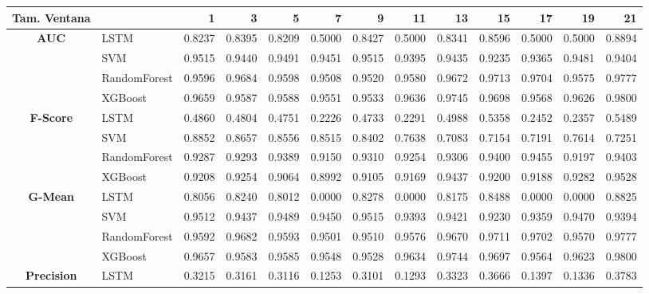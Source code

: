 \begin{table}[h]
	\centering
	\begin{adjustbox}{max width=15cm}
		\begin{tabular}{|c|l|r|r|r|r|r|r|r|r|r|r|r|}
			\hline
			\textbf{Tam. Ventana}&         &      1  &      3  &      5  &      7  &      9  &      11 &      13 &      15 &      17 &      19 &      21 \\
			\hline
			\textbf{AUC} & LSTM &  0.8237 &  0.8395 &  0.8209 &  0.5000 &  0.8427 &  0.5000 &  0.8341 &  0.8596 &  0.5000 &  0.5000 &  0.8894 \\
			& SVM &  0.9515 &  0.9440 &  0.9491 &  0.9451 &  0.9515 &  0.9395 &  0.9435 &  0.9235 &  0.9365 &  0.9481 &  0.9404 \\
			& RandomForest &  0.9596 &  0.9684 &  0.9598 &  0.9508 &  0.9520 &  0.9580 &  0.9672 &  0.9713 &  0.9704 &  0.9575 &  0.9777 \\
			& XGBoost &  0.9659 &  0.9587 &  0.9588 &  0.9551 &  0.9533 &  0.9636 &  0.9745 &  0.9698 &  0.9568 &  0.9626 &  0.9800 \\
			\hline
			\textbf{F-Score} & LSTM &  0.4860 &  0.4804 &  0.4751 &  0.2226 &  0.4733 &  0.2291 &  0.4988 &  0.5358 &  0.2452 &  0.2357 &  0.5489 \\
			& SVM &  0.8852 &  0.8657 &  0.8556 &  0.8515 &  0.8402 &  0.7638 &  0.7083 &  0.7154 &  0.7191 &  0.7614 &  0.7251 \\
			& RandomForest &  0.9287 &  0.9293 &  0.9389 &  0.9150 &  0.9310 &  0.9254 &  0.9306 &  0.9400 &  0.9455 &  0.9197 &  0.9403 \\
			& XGBoost &  0.9208 &  0.9254 &  0.9064 &  0.8992 &  0.9105 &  0.9169 &  0.9437 &  0.9200 &  0.9188 &  0.9282 &  0.9528 \\
			\hline
			\textbf{G-Mean} & LSTM &  0.8056 &  0.8240 &  0.8012 &  0.0000 &  0.8278 &  0.0000 &  0.8175 &  0.8488 &  0.0000 &  0.0000 &  0.8825 \\
			& SVM &  0.9512 &  0.9437 &  0.9489 &  0.9450 &  0.9515 &  0.9393 &  0.9421 &  0.9230 &  0.9359 &  0.9470 &  0.9394 \\
			& RandomForest &  0.9592 &  0.9682 &  0.9593 &  0.9501 &  0.9510 &  0.9576 &  0.9670 &  0.9711 &  0.9702 &  0.9570 &  0.9777 \\
			& XGBoost &  0.9657 &  0.9583 &  0.9585 &  0.9548 &  0.9528 &  0.9634 &  0.9744 &  0.9697 &  0.9564 &  0.9623 &  0.9800 \\
			\hline
			\textbf{Precision} & LSTM &  0.3215 &  0.3161 &  0.3116 &  0.1253 &  0.3101 &  0.1293 &  0.3323 &  0.3666 &  0.1397 &  0.1336 &  0.3783 \\

\end{tabular}
\end{adjustbox}
\end{table}
